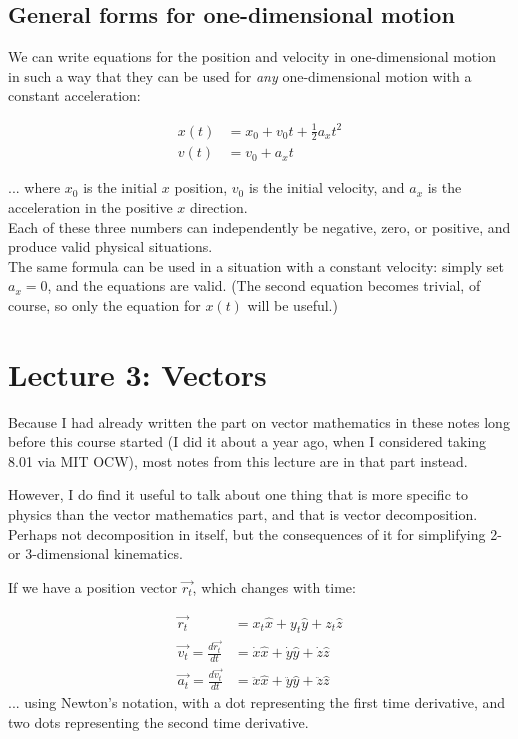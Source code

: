 \subsection{General forms for one-dimensional motion}

We can write equations for the position and velocity in one-dimensional motion in such a way that they can be used for \emph{any} one-dimensional motion with a constant acceleration:

\begin{align}
x(t) &= x_0 + v_0 t + \frac{1}{2} a_x t^2\\
v(t) &= v_0 + a_x t
\end{align}

... where $x_0$ is the initial $x$ position, $v_0$ is the initial velocity, and $a_x$ is the acceleration in the positive $x$ direction.\\
Each of these three numbers can independently be negative, zero, or positive, and produce valid physical situations.\\
The same formula can be used in a situation with a constant velocity: simply set $a_x = 0$, and the equations are valid. (The second equation becomes trivial, of course, so only the equation for $x(t)$ will be useful.)

\section{Lecture 3: Vectors}

Because I had already written the part on vector mathematics in these notes long before this course started (I did it about a year ago, when I considered taking 8.01 via MIT OCW), most notes from this lecture are in that part instead.

However, I do find it useful to talk about one thing that is more specific to physics than the vector mathematics part, and that is vector decomposition. Perhaps not decomposition in itself, but the consequences of it for simplifying 2- or 3-dimensional kinematics.

If we have a position vector $\vec{r_t}$, which changes with time:

\begin{align}
 \vec{r_t} &= x_t \hat{x} + y_t \hat{y} + z_t \hat{z} \\
 \vec{v_t} = \frac{d\vec{r_t}}{dt} &= \dot{x} \hat{x} + \dot{y} \hat{y} + \dot{z} \hat{z}\\
 \vec{a_t} = \frac{d\vec{v_t}}{dt} &= \ddot{x} \hat{x} + \ddot{y} \hat{y} + \ddot{z} \hat{z}
\end{align}
... using Newton's notation, with a dot representing the first time derivative, and two dots representing the second time derivative.

